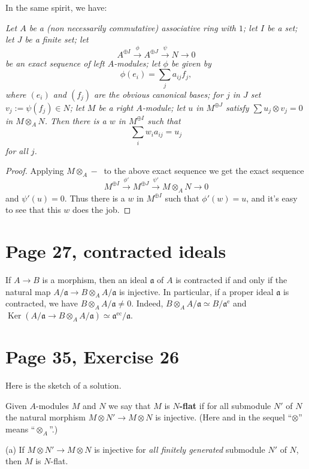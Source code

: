 \documentclass[parskip=half]{scrartcl}%
\newcommand{\oo}{\operatorname}
\newcommand{\mf}{\mathfrak}
\begin{document}
In the same spirit, we have:

\emph{Let $A$ be a (non necessarily commutative) associative ring with $1$; let $I$ be a set; let $J$ be a finite set; let 
$$
A^{\oplus I}\xrightarrow\phi A^{\oplus J}\xrightarrow\psi N\to0
$$ 
be an exact sequence of left $A$-modules; let $\phi$ be given by 
$$
\phi(e_i)=\sum_ja_{ij}f_j,
$$ 
where $(e_i)$ and $(f_j)$ are the obvious canonical bases; for $j$ in $J$ set $v_j:=\psi(f_j)\in N$; let $M$ be a right $A$-module; let $u$ in $M^{\oplus J}$ satisfy $\sum u_j\otimes v_j=0$ in $M\otimes_AN$. Then there is a $w$ in $M^{\oplus I}$ such that 
$$
\sum_iw_ia_{ij}=u_j
$$ 
for all $j$.}

\begin{proof} 
Applying $M\otimes_A-\ $ to the above exact sequence we get the exact sequence 
$$
M^{\oplus I}\xrightarrow{\phi'}M^{\oplus J}\xrightarrow{\psi'}M\otimes_AN\to0
$$ 
and $\psi'(u)=0$. Thus there is a $w$ in $M^{\oplus I}$ such that $\phi'(w)=u$, and it's easy to see that this $w$ does the job. 
\end{proof}

\section{Page 27, contracted ideals}\label{27}%

If $A\to B$ is a morphism, then an ideal $\mf a$ of $A$ is contracted if and only if the natural map $A/\mf a\to B\otimes_A A/\mf a$ is injective. In particular, if a proper ideal $\mf a$ is contracted, we have $B\otimes_A A/\mf a\ne0$. Indeed, $B\otimes_A A/\mf a\simeq B/\mf a^{\oo e}$ and $\oo{Ker}(A/\mf a\to B\otimes_A A/\mf a)\simeq\mf a^{\oo{ec}}/\mf a$. %


\section{Page 35, Exercise 26}\label{35}%

Here is the sketch of a solution.

Given $A$-modules $M$ and $N$ we say that $M$ is $N$\textbf{-flat} if for all submodule $N'$ of $N$ the natural morphism $M\otimes N'\to M\otimes N$ is injective. (Here and in the sequel ``$\otimes$'' means ``$\otimes_A$''.) 

(a) If $M\otimes N'\to M\otimes N$ is injective for \emph{all finitely generated} submodule $N'$ of $N$, then $M$ is $N$-flat.
\end{document}
